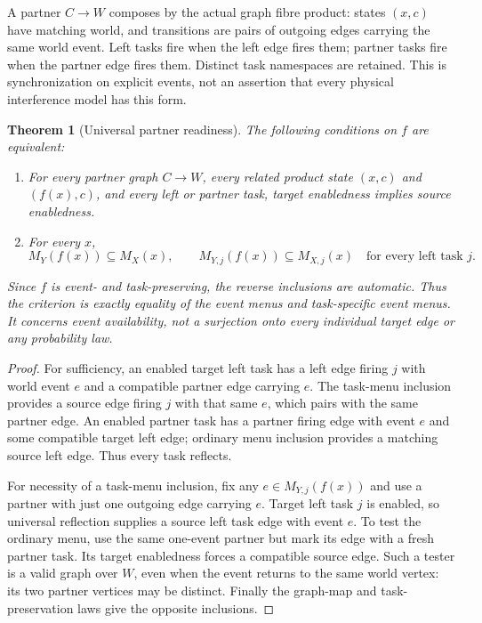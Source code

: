 \documentclass[11pt]{article}
\newtheorem{theorem}{Theorem}\newtheorem{proposition}{Proposition}
\begin{document}
A partner $C\to W$ composes by the actual graph fibre product: states $(x,c)$ have matching world, and transitions are pairs of outgoing edges carrying the same world event. Left tasks fire when the left edge fires them; partner tasks fire when the partner edge fires them. Distinct task namespaces are retained. This is synchronization on explicit events, not an assertion that every physical interference model has this form.

\begin{theorem}[Universal partner readiness]
The following conditions on $f$ are equivalent:
\begin{enumerate}
\item For every partner graph $C\to W$, every related product state $(x,c)$ and $(f(x),c)$, and every left or partner task, target enabledness implies source enabledness.
\item For every $x$,
\[
 M_Y(f(x))\subseteq M_X(x),\qquad
 M_{Y,j}(f(x))\subseteq M_{X,j}(x)\quad\text{for every left task }j.
\]
\end{enumerate}
Since $f$ is event- and task-preserving, the reverse inclusions are automatic. Thus the criterion is exactly equality of the event menus and task-specific event menus. It concerns event availability, not a surjection onto every individual target edge or any probability law.
\end{theorem}
\begin{proof}
For sufficiency, an enabled target left task has a left edge firing $j$ with world event $e$ and a compatible partner edge carrying $e$. The task-menu inclusion provides a source edge firing $j$ with that same $e$, which pairs with the same partner edge. An enabled partner task has a partner firing edge with event $e$ and some compatible target left edge; ordinary menu inclusion provides a matching source left edge. Thus every task reflects.

For necessity of a task-menu inclusion, fix any $e\in M_{Y,j}(f(x))$ and use a partner with just one outgoing edge carrying $e$. Target left task $j$ is enabled, so universal reflection supplies a source left task edge with event $e$. To test the ordinary menu, use the same one-event partner but mark its edge with a fresh partner task. Its target enabledness forces a compatible source edge. Such a tester is a valid graph over $W$, even when the event returns to the same world vertex: its two partner vertices may be distinct. Finally the graph-map and task-preservation laws give the opposite inclusions.
\end{proof}
\end{document}
